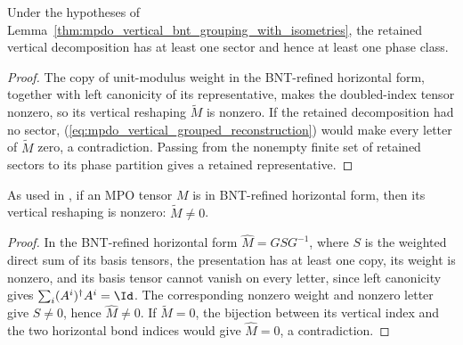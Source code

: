 \begin{lemma}
    \label{lem:mpdo_vertical_retained_class_nonempty}
    \leanok
    Under the hypotheses of
    Lemma~\ref{thm:mpdo_vertical_bnt_grouping_with_isometries}, the retained
    vertical decomposition has at least one sector and hence at least one
    phase class.
\end{lemma}

\begin{proof}
    \leanok
    The copy of unit-modulus weight in the BNT-refined horizontal
    form, together with left canonicity of its representative, makes the doubled-index tensor
    nonzero, so its vertical reshaping $\widetilde M$ is nonzero. If the
    retained decomposition had no sector,
    (\ref{eq:mpdo_vertical_grouped_reconstruction}) would make every letter of
    $\widetilde M$ zero, a contradiction. Passing from the nonempty finite set
    of retained sectors to its phase partition gives a retained representative.
\end{proof}

\begin{lemma}
    \label{thm:mpdo_vertical_tensor_nonzero}
    \leanok
    As used in \cite[Proposition~4.13, lines~1895--1902]{Cirac2016MPDO_arXiv},
    if an MPO tensor $M$ is in BNT-refined horizontal form, then
    its vertical reshaping is nonzero: $\widetilde M\ne0$.
\end{lemma}

\begin{proof}
    \leanok
    In the BNT-refined horizontal form $\widehat M=GSG^{-1}$, where
    $S$ is the weighted direct sum of its basis tensors, the presentation has
    at least one copy, its weight is nonzero, and its basis tensor cannot
    vanish on every letter,
    since left canonicity gives $\sum_i(A^i)^\dagger A^i=\Id$.
    The corresponding nonzero weight and nonzero letter give $S\ne0$, hence
    $\widehat M\ne0$. If $\widetilde M=0$, the bijection between its vertical
    index and the two horizontal bond indices would give $\widehat M=0$, a
    contradiction.
\end{proof}

